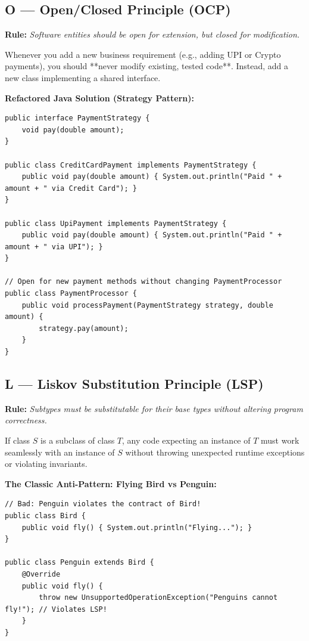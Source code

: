\documentclass[10pt,journal,compsoc,onecolumn]{IEEEtran}
\begin{document}
\subsection{O --- Open/Closed Principle (OCP)}
\textbf{Rule:} \emph{Software entities should be open for extension, but closed for modification.}

Whenever you add a new business requirement (e.g., adding UPI or Crypto payments), you should **never modify existing, tested code**. Instead, add a new class implementing a shared interface.

\textbf{Refactored Java Solution (Strategy Pattern):}
\begin{verbatim}
public interface PaymentStrategy {
    void pay(double amount);
}

public class CreditCardPayment implements PaymentStrategy {
    public void pay(double amount) { System.out.println("Paid " + amount + " via Credit Card"); }
}

public class UpiPayment implements PaymentStrategy {
    public void pay(double amount) { System.out.println("Paid " + amount + " via UPI"); }
}

// Open for new payment methods without changing PaymentProcessor
public class PaymentProcessor {
    public void processPayment(PaymentStrategy strategy, double amount) {
        strategy.pay(amount);
    }
}
\end{verbatim}

\subsection{L --- Liskov Substitution Principle (LSP)}
\textbf{Rule:} \emph{Subtypes must be substitutable for their base types without altering program correctness.}

If class $S$ is a subclass of class $T$, any code expecting an instance of $T$ must work seamlessly with an instance of $S$ without throwing unexpected runtime exceptions or violating invariants.

\textbf{The Classic Anti-Pattern: Flying Bird vs Penguin:}
\begin{verbatim}
// Bad: Penguin violates the contract of Bird!
public class Bird {
    public void fly() { System.out.println("Flying..."); }
}

public class Penguin extends Bird {
    @Override
    public void fly() {
        throw new UnsupportedOperationException("Penguins cannot fly!"); // Violates LSP!
    }
}
\end{verbatim}
\end{document}
